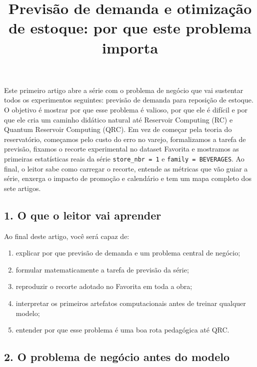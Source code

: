\documentclass[12pt]{article}
\title{Previsão de demanda e otimização de estoque: por que este problema importa}
\author{}
\providecommand{\tightlist}{%
  \setlength{\itemsep}{0pt}\setlength{\parskip}{0pt}}
\begin{document}
\maketitle

\begin{resumo}
Este primeiro artigo abre a série com o problema de negócio que vai sustentar todos os experimentos seguintes: previsão de demanda para reposição de estoque. O objetivo é mostrar por que esse problema é valioso, por que ele é difícil e por que ele cria um caminho didático natural até Reservoir Computing (RC) e Quantum Reservoir Computing (QRC). Em vez de começar pela teoria do reservatório, começamos pelo custo do erro no varejo, formalizamos a tarefa de previsão, fixamos o recorte experimental no dataset Favorita e mostramos as primeiras estatísticas reais da série \texttt{store\_nbr\ =\ 1} e \texttt{family\ =\ BEVERAGES}. Ao final, o leitor sabe como carregar o recorte, entende as métricas que vão guiar a série, enxerga o impacto de promoção e calendário e tem um mapa completo dos sete artigos.
\end{resumo}

\subsection{1. O que o leitor vai aprender}\label{1-o-que-o-leitor-vai-aprender}

Ao final deste artigo, você será capaz de:

\begin{enumerate}
\def\labelenumi{\arabic{enumi}.}
\tightlist
\item
  explicar por que previsão de demanda e um problema central de negócio;
\item
  formular matematicamente a tarefa de previsão da série;
\item
  reproduzir o recorte adotado no Favorita em toda a obra;
\item
  interpretar os primeiros artefatos computacionais antes de treinar qualquer modelo;
\item
  entender por que esse problema é uma boa rota pedagógica até QRC.
\end{enumerate}

\subsection{2. O problema de negócio antes do modelo}\label{2-o-problema-de-neguxf3cio-antes-do-modelo}
\end{document}
